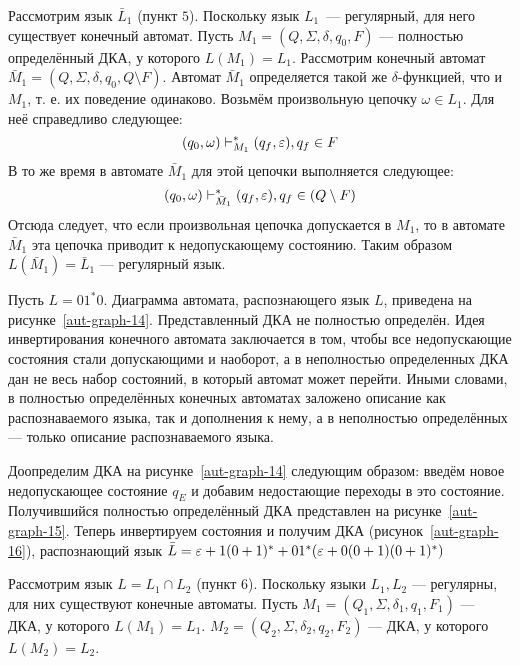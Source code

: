 Рассмотрим язык $\bar L_1$ (пункт $5$). Поскольку язык $L_1$~--- 
регулярный, для него существует конечный автомат. Пусть $M_1 = 
(Q,\Sigma, \delta, q_0, F)$ --- полностью определённый ДКА, у которого 
$L(M_1) = L_1$. Рассмотрим конечный автомат $\bar M_1 = (Q,\Sigma, 
\delta, q_0, Q \setminus F)$. Автомат $\bar M_1$ определяется такой же 
$\delta$-функцией, что и $M_1$, т. е. их поведение одинаково. Возьмём 
произвольную цепочку $\omega \in L_1$. Для неё справедливо следующее: 
\[ (q_0, \omega) \vdash_{M_1}^* (q_f, \varepsilon), q_f \in F \] В то же время 
в автомате $\bar M_1$ для этой цепочки выполняется следующее: \[ (q_0, 
\omega) \vdash_{\bar M_1}^* (q_f, \varepsilon), q_f \in (Q \setminus F) \] 
Отсюда следует, что если произвольная цепочка допускается в $M_1$, то в 
автомате $\bar M_1$ эта цепочка приводит к недопускающему состоянию. 
Таким образом $L(\bar M_1) = \bar L_1$ --- регулярный язык. 



\begin{myexample}\label{ex-513}
Пусть $L = 01^*0$. Диаграмма автомата, распознающего 
язык $L$, приведена на рисунке~\ref{aut-graph-14}. Представленный ДКА 
не полностью определён. Идея инвертирования конечного автомата 
заключается в том, чтобы все недопускающие состояния стали допускающими 
и наоборот, а в неполностью определенных ДКА дан не весь набор 
состояний, в который автомат может перейти. Иными словами, в полностью 
определённых конечных автоматах заложено описание как распознаваемого 
языка, так и дополнения к нему, а в неполностью определённых --- только 
описание распознаваемого языка.



Доопределим ДКА на рисунке~\ref{aut-graph-14} следующим образом: введём 
новое недопускающее состояние $q_E$ и добавим недостающие переходы в 
это состояние. Получившийся полностью определённый ДКА представлен на 
рисунке~\ref{aut-graph-15}. Теперь инвертируем состояния и получим ДКА 
(рисунок~\ref{aut-graph-16}), распознающий язык $\bar L = \varepsilon + 1(0 + 
1)^* + 01^*(\varepsilon + 0(0+1)(0+1)^*)$ 
\end{myexample}



Рассмотрим язык $L = L_1 \cap L_2$ (пункт $6$). Поскольку языки $L_1, L_2$ --- регулярны, для них существуют конечные автоматы. Пусть $M_1 = (Q_1,\Sigma, \delta_1, q_1, F_1)$ --- ДКА, у которого $L(M_1) = L_1$. $M_2 = (Q_2,\Sigma, \delta_2, q_2, F_2)$ --- ДКА, у которого $L(M_2) = L_2$.


